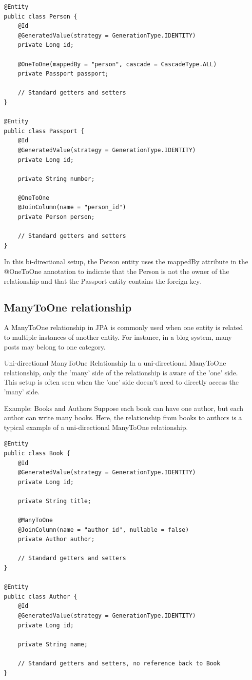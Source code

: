 \begin{lstlisting}
@Entity
public class Person {
    @Id
    @GeneratedValue(strategy = GenerationType.IDENTITY)
    private Long id;

    @OneToOne(mappedBy = "person", cascade = CascadeType.ALL)
    private Passport passport;

    // Standard getters and setters
}

@Entity
public class Passport {
    @Id
    @GeneratedValue(strategy = GenerationType.IDENTITY)
    private Long id;

    private String number;

    @OneToOne
    @JoinColumn(name = "person_id")
    private Person person;

    // Standard getters and setters
}
\end{lstlisting}

In this bi-directional setup, the Person entity uses the mappedBy attribute in the @OneToOne annotation to indicate that the Person is not the owner of the relationship and that the Passport entity contains the foreign key.

\subsection{ManyToOne relationship}

A ManyToOne relationship in JPA is commonly used when one entity is related to multiple instances of another entity. For instance, in a blog system, many posts may belong to one category.

Uni-directional ManyToOne Relationship
In a uni-directional ManyToOne relationship, only the 'many' side of the relationship is aware of the 'one' side. This setup is often seen when the 'one' side doesn't need to directly access the 'many' side.

Example: Books and Authors
Suppose each book can have one author, but each author can write many books. Here, the relationship from books to authors is a typical example of a uni-directional ManyToOne relationship.

\begin{lstlisting}
@Entity
public class Book {
    @Id
    @GeneratedValue(strategy = GenerationType.IDENTITY)
    private Long id;

    private String title;

    @ManyToOne
    @JoinColumn(name = "author_id", nullable = false)
    private Author author;

    // Standard getters and setters
}

@Entity
public class Author {
    @Id
    @GeneratedValue(strategy = GenerationType.IDENTITY)
    private Long id;

    private String name;

    // Standard getters and setters, no reference back to Book
}
\end{lstlisting}

